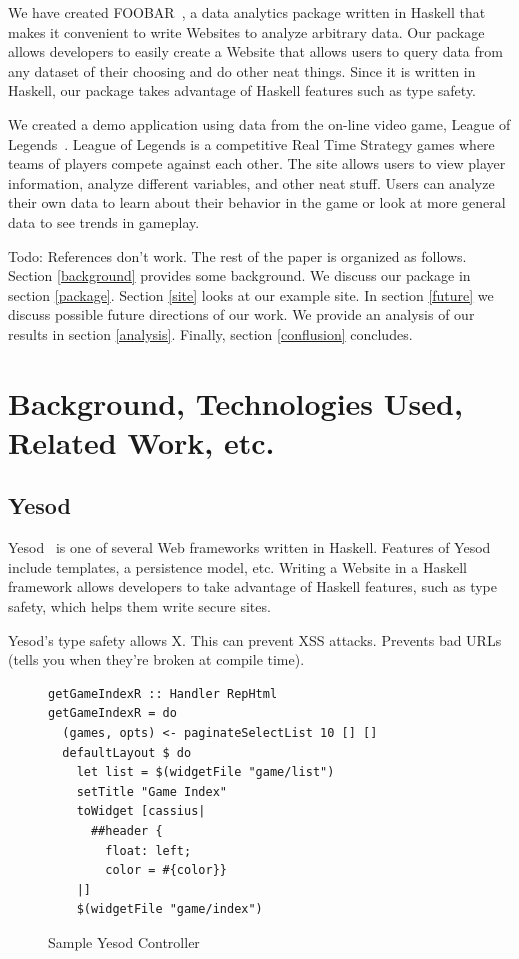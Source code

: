 \documentclass{chi2009}
\begin{document}
We have created FOOBAR~\cite{foobar}, a data analytics package written in Haskell that makes it convenient to write Websites to analyze arbitrary data. Our package allows developers to easily create a Website that allows users to query data from any dataset of their choosing and do other neat things. Since it is written in Haskell, our package takes advantage of Haskell features such as type safety. 

We created  a demo application using data from the on-line video game, League of Legends~\cite{lol}. League of Legends is a competitive Real Time Strategy games where teams of players compete against each other. The site allows users to view player information, analyze different variables, and other neat stuff. Users can analyze their own data to learn about their behavior in the game or look at more general data to see trends in gameplay. 

Todo: References don't work.
The rest of the paper is organized as follows. Section \ref{background} provides some background. We discuss our package in section \ref{package}. Section \ref{site} looks at our example site. In section \ref{future} we discuss possible future directions of our work. We provide an analysis of our results in section \ref{analysis}. Finally, section \ref{conflusion} concludes.

\section{Background, Technologies Used, Related Work, etc.}
\label{sec:background}

\subsection{Yesod}

Yesod~\cite{yesod} is one of several Web frameworks written in Haskell. Features of Yesod include templates, a persistence model, etc. Writing a Website in a Haskell framework allows developers to take advantage of Haskell features, such as type safety, which helps them write secure sites.

Yesod's type safety allows X. This can prevent XSS attacks. Prevents bad URLs (tells you when they're broken at compile time).

\begin{figure}[]
\begin{verbatim}
getGameIndexR :: Handler RepHtml
getGameIndexR = do
  (games, opts) <- paginateSelectList 10 [] []
  defaultLayout $ do
    let list = $(widgetFile "game/list")
    setTitle "Game Index"
    toWidget [cassius|
      ##header {
        float: left;
        color = #{color}}
    |] 
    $(widgetFile "game/index")
\end{verbatim}
    \caption{Sample Yesod Controller}
    \label{controller}
\end{figure}
\end{document}
